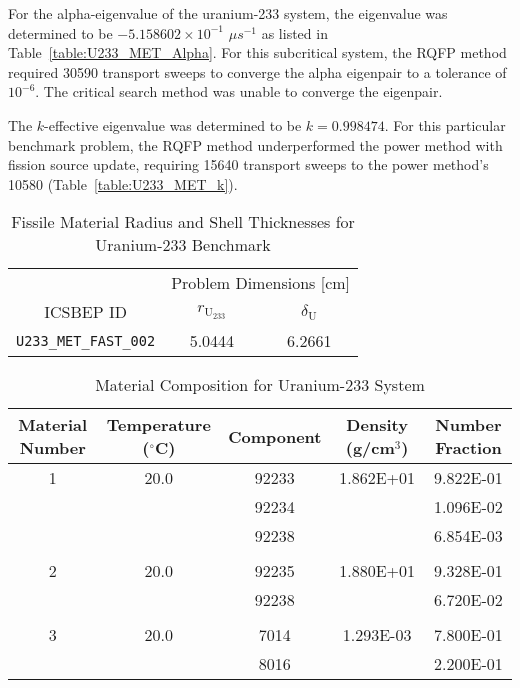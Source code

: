 For the alpha-eigenvalue of the uranium-233 system, the eigenvalue was determined to be $-5.158602 \times 10^{-1}$ $\mu s^{-1}$ as listed in Table~\ref{table:U233_MET_Alpha}. For this subcritical system, the RQFP method required 30590 transport sweeps to converge the alpha eigenpair to a tolerance of $10^{-6}$. The critical search method was unable to converge the eigenpair.

The $k$-effective eigenvalue was determined to be $k = 0.998474$. For this particular benchmark problem, the RQFP method underperformed the power method with fission source update, requiring 15640 transport sweeps to the power method's 10580 (Table~\ref{table:U233_MET_k}).

\begin{table}[!htbp]
	\centering{}
	\begin{tabular}{@{}ccc@{}}\toprule
	& \multicolumn{2}{c}{Problem Dimensions [cm]} \\
	\cmidrule{2-3} ICSBEP ID & $r_{\text{U$_{233}$}}$ & $\delta_{\text{U}}$ \\
	\midrule
	\texttt{U233\_MET\_FAST\_002} & 5.0444 & 6.2661 \\
	\bottomrule
	\end{tabular}
	\caption{Fissile Material Radius and Shell Thicknesses for Uranium-233 Benchmark}
	\label{table:U233_MET_Dims}
\end{table}

\begin{table}[!htbp]
	\caption{Material Composition for Uranium-233 System}
	\label{table:U233}
		\centering{}
		\begin{tabular}{@{}ccccc@{}}\toprule
			Material Number & Temperature ($^{\circ}$C) & Component & Density (g/cm$^{3}$) & Number Fraction \\ 
        			\midrule
         1  &  20.0 &    92233  &       1.862E+01  & 9.822E-01 \\
            & &          92234      &     &          1.096E-02 \\
           & &            92238     &     &           6.854E-03 \\
	& & & & \\
         2    & 20.0 &    92235   &      1.880E+01  & 9.328E-01 \\
        & &               92238     &  &              6.720E-02 \\
	& & & & \\
         3   & 20.0  &  7014  &        1.293E-03  & 7.800E-01 \\
          & &              8016   & &                2.200E-01 \\
		\bottomrule
		\end{tabular}
\end{table}

